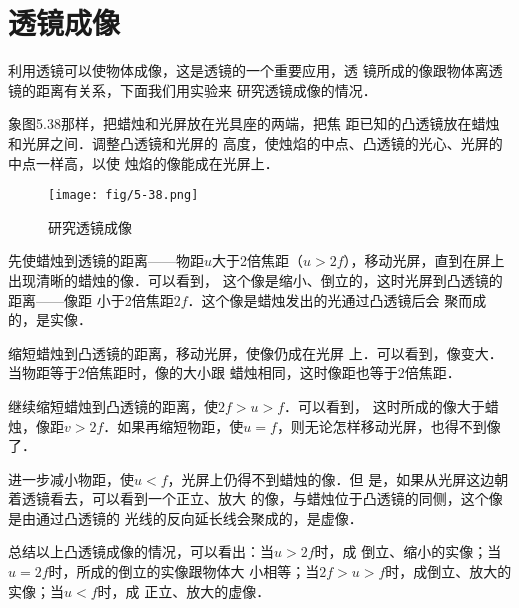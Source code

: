 \begin{figure}
\begin{tikzpicture}[>=latex]
    \end{tikzpicture}
\caption{}
\end{figure}

 \section{透镜成像}
    利用透镜可以使物体成像，这是透镜的一个重要应用，透
    镜所成的像跟物体离透镜的距离有关系，下面我们用实验来
    研究透镜成像的情况．

    象图5.38那样，把蜡烛和光屏放在光具座的两端，把焦
    距已知的凸透镜放在蜡烛和光屏之间．调整凸透镜和光屏的
    高度，使烛焰的中点、凸透镜的光心、光屏的中点一样高，以使
    烛焰的像能成在光屏上．
    \begin{figure}[htp]\centering
        \texttt{[image: fig/5-38.png]}
        \caption{研究透镜成像}
        \end{figure}

    先使蜡烛到透镜的距离——物距$u$大于2倍焦距（$u>
    2f$），移动光屏，直到在屏上出现清晰的蜡烛的像．可以看到，
    这个像是缩小、倒立的，这时光屏到凸透镜的距离——像距
    小于2倍焦距$2f$．这个像是蜡烛发出的光通过凸透镜后会
    聚而成的，是实像．

    缩短蜡烛到凸透镜的距离，移动光屏，使像仍成在光屏
    上．可以看到，像变大．当物距等于2倍焦距时，像的大小跟
    蜡烛相同，这时像距也等于2倍焦距．

    继续缩短蜡烛到凸透镜的距离，使$2f>u>f$．可以看到，
    这时所成的像大于蜡烛，像距$v>2f$．如果再缩短物距，使$u=
    f$，则无论怎样移动光屏，也得不到像了．

    进一步减小物距，使$u<f$，光屏上仍得不到蜡烛的像．但
    是，如果从光屏这边朝着透镜看去，可以看到一个正立、放大
    的像，与蜡烛位于凸透镜的同侧，这个像是由通过凸透镜的
    光线的反向延长线会聚成的，是虚像．

    总结以上凸透镜成像的情况，可以看出：当$u>2f$时，成
    倒立、缩小的实像；当$u=2f$时，所成的倒立的实像跟物体大
    小相等；当$2f>u>f$时，成倒立、放大的实像；当$u<f$时，成
    正立、放大的虚像．

